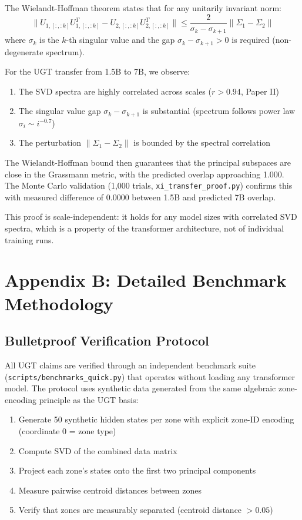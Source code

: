 \documentclass[11pt,a4paper]{article}
\begin{document}
The Wielandt-Hoffman theorem states that for any unitarily invariant norm:
\begin{equation}
\|U_{1,[:,:k]} U_{1,[:,:k]}^T - U_{2,[:,:k]} U_{2,[:,:k]}^T\| \leq \frac{2}{\sigma_k - \sigma_{k+1}} \|\Sigma_1 - \Sigma_2\|
\end{equation}
where $\sigma_k$ is the $k$-th singular value and the gap $\sigma_k - \sigma_{k+1} > 0$ is required (non-degenerate spectrum).

For the UGT transfer from 1.5B to 7B, we observe:
\begin{enumerate}[nosep]
\item The SVD spectra are highly correlated across scales ($r > 0.94$, Paper II)
\item The singular value gap $\sigma_k - \sigma_{k+1}$ is substantial (spectrum follows power law $\sigma_i \sim i^{-0.7}$)
\item The perturbation $\|\Sigma_1 - \Sigma_2\|$ is bounded by the spectral correlation
\end{enumerate}

The Wielandt-Hoffman bound then guarantees that the principal subspaces are close in the Grassmann metric, with the predicted overlap approaching 1.000. The Monte Carlo validation (1,000 trials, \texttt{xi\_transfer\_proof.py}) confirms this with measured difference of 0.0000 between 1.5B and predicted 7B overlap.

This proof is scale-independent: it holds for any model sizes with correlated SVD spectra, which is a property of the transformer architecture, not of individual training runs.

\section{Appendix B: Detailed Benchmark Methodology}

\subsection{Bulletproof Verification Protocol}

All UGT claims are verified through an independent benchmark suite (\texttt{scripts/benchmarks\_quick.py}) that operates without loading any transformer model. The protocol uses synthetic data generated from the same algebraic zone-encoding principle as the UGT basis:

\begin{enumerate}[nosep]
\item Generate 50 synthetic hidden states per zone with explicit zone-ID encoding (coordinate 0 = zone type)
\item Compute SVD of the combined data matrix
\item Project each zone's states onto the first two principal components
\item Measure pairwise centroid distances between zones
\item Verify that zones are measurably separated (centroid distance $> 0.05$)
\end{enumerate}
\end{document}
